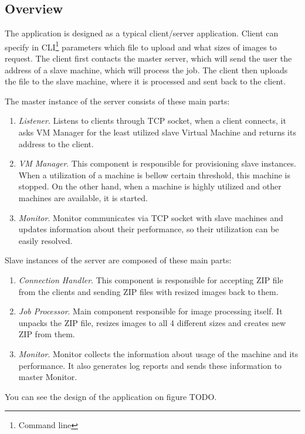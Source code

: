 \subsection{Overview}
The application is designed as a typical client/server application. Client can specify in CLI\footnote{Command line} parameters which file to upload and what sizes of images to request. The client first contacts the master server, which will send the user the address of a slave machine, which will process the job. The client then uploads the file to the slave machine, where it is processed and sent back to the client.

The master instance of the server consists of these main parts:

\begin{enumerate}
 \item \emph{Listener}. Listens to clients through TCP socket, when a client connects, it asks VM Manager for the least utilized slave Virtual Machine and returns its address to the client.
 \item \emph{VM Manager}. This component is responsible for provisioning slave instances. When a utilization of a machine is bellow certain threshold, this machine is stopped. On the other hand, when a machine is highly utilized and other machines  are available, it is started.
 \item \emph{Monitor}. Monitor communicates via TCP socket with slave machines and updates information about their performance, so their utilization can  be easily resolved.
\end{enumerate}

Slave instances of the server are composed of these main parts:

\begin{enumerate}
 \item \emph{Connection Handler}. This component is responsible for accepting ZIP file from the clients and sending ZIP files with resized images back to them.
 \item \emph{Job Processor}. Main component responsible for image processing itself. It unpacks the ZIP file, resizes images to all 4 different sizes and creates new ZIP from them.
 \item \emph{Monitor}. Monitor collects the information about usage of the machine and its performance. It also generates log reports and sends these information to master Monitor.
\end{enumerate}

You can see the design of the application on figure TODO.


